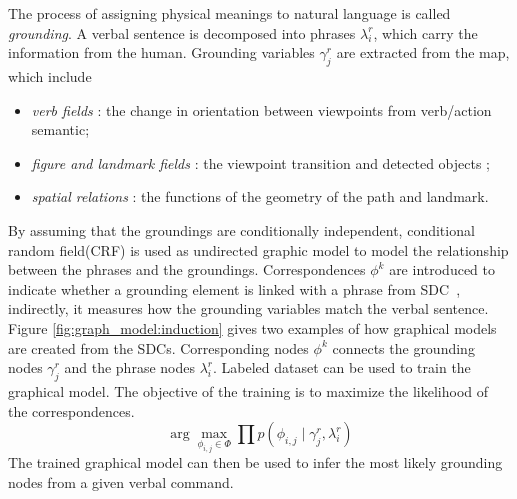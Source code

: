 \documentclass[phd]{byuprop}
\begin{document}
The process of assigning physical meanings to natural language is called {\em grounding}.
A verbal sentence is decomposed into phrases $ \lambda^{r}_{i} $, which carry the information from the human.
Grounding variables $ \gamma^{r}_{j} $ are extracted from the map, which include
\begin{itemize}
\item {\em verb fields} : the change in orientation between viewpoints from verb/action semantic;
\item {\em figure and landmark fields} : the viewpoint transition and detected objects ;
\item {\em spatial relations} : the functions of the geometry of the path and landmark.
\end{itemize}
By assuming that the groundings are conditionally independent, conditional random field(CRF) is used as undirected graphic model to model the relationship between the phrases and the groundings.
Correspondences $ \phi^{k} $ are introduced to indicate whether a grounding element is linked with a phrase from SDC~\cite{tellex2011understanding},
indirectly, it measures how the grounding variables match the verbal sentence.
Figure \ref{fig:graph_model:induction} gives two examples of how graphical models are created from the SDCs.
Corresponding nodes $ \phi^{k} $ connects the grounding nodes $ \gamma^{r}_{j} $ and the phrase nodes $ \lambda^{r}_{i} $.
Labeled dataset can be used to train the graphical model.
The objective of the training is to maximize the likelihood of the correspondences.
\begin{equation}
\arg \max_{\phi_{i,j} \in \Phi } \prod p( \phi_{i,j} \mid \gamma^{r}_{j} , \lambda^{r}_{i} )
\end{equation}
The trained graphical model can then be used to infer the most likely grounding nodes from a given verbal command.
\end{document}

